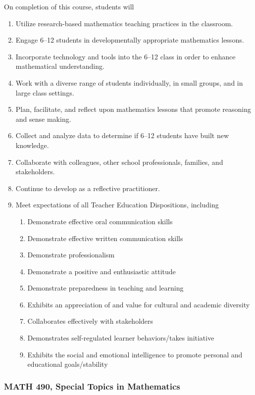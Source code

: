 \documentclass[11pt]{article}
\newenvironment{alphalist}{
\begin{enumerate}[label=(\arabic*),widest=107 ,leftmargin=25pt, itemsep=0pt]}
{\end{enumerate}}
\newenvironment{betalist}{
\begin{enumerate}[label=(\alph*),widest=zzz,leftmargin=25pt,itemsep=0pt]}
{\end{enumerate}}
\begin{document}
On completion of this course, students will
\begin{alphalist}
\item Utilize research-based mathematics teaching practices in the classroom.
\item Engage 6--12 students in developmentally appropriate mathematics lessons.
\item Incorporate technology and tools into the 6--12 class in order to enhance mathematical understanding.
\item Work with a diverse range of students individually, in small groups, and in large class settings.
\item Plan, facilitate, and reflect upon mathematics lessons that promote reasoning and sense making.
\item Collect and analyze data to determine if 6--12 students have built new knowledge. 
\item Collaborate with colleagues, other school professionals, families, and stakeholders.
\item Continue to develop as a reflective practitioner.
\item Meet expectations of all Teacher Education Dispositions, including
\begin{betalist}
\item Demonstrate effective oral communication skills
\item Demonstrate effective written communication skills
\item Demonstrate professionalism
\item Demonstrate a positive and enthusiastic attitude
\item Demonstrate preparedness in teaching and learning
\item Exhibits an appreciation of and value for cultural and academic diversity
\item Collaborates effectively with stakeholders
\item Demonstrates self-regulated learner behaviors/takes initiative
\item Exhibits the social and emotional intelligence to promote personal and educational goals/stability
\end{betalist}
\end{alphalist}

\subsubsection{MATH 490, Special Topics in Mathematics}
\end{document}
